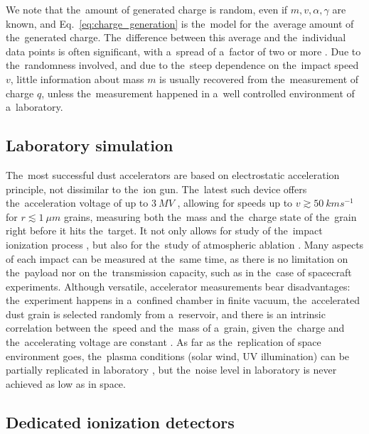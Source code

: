 We note that the~amount of generated charge is random, even if $m,v,\alpha,\gamma$ are known, and Eq.~\ref{eq:charge_generation} is the~model for the~average amount of the~generated charge. The~difference between this average and the~individual data points is often significant, with a~spread of a~factor of two or more \citep{collette2014micrometeoroid,shen2021cosmic}. Due to the~randomness involved, and due to the~steep dependence on the~impact speed $v$, little information about mass $m$ is usually recovered from the~measurement of charge $q$, unless the~measurement happened in a~well controlled environment of a~laboratory.

\subsection{Laboratory simulation}

The~most successful dust accelerators are based on electrostatic acceleration principle, not dissimilar to the~ion gun. The~latest such device offers the~acceleration voltage of up to $\SI{3}{MV}$ \citep{shu20123}, allowing for speeds up to $v\gtrsim \SI{50}{kms^{-1}}$ for $r\lesssim\SI{1}{\mu m}$ grains, measuring both the~mass and the~charge state of the~grain right before it hits the~target. It not only allows for study of the~impact ionization process \citep{collette2014micrometeoroid,nouzak2018laboratory,kovcivsvcak2020effective,nouzak2021detection,shen2021electrostatic,shen2021laboratory,shen2023variability}, but also for the~study of atmospheric ablation \citep{thomas2017experimental,deluca2018ionization,deluca2022differential,tarnecki2023experimentally}. Many aspects of each impact can be measured at the~same time, as there is no limitation on the~payload nor on the~transmission capacity, such as in the~case of spacecraft experiments. Although versatile, accelerator measurements bear disadvantages: the~experiment happens in a~confined chamber in finite vacuum, the~accelerated dust grain is selected randomly from a~reservoir, and there is an intrinsic correlation between the~speed and the~mass of a~grain, given the~charge and the~accelerating voltage are constant \citep{shelton1960electrostatic}. As far as the~replication of space environment goes, the~plasma conditions (solar wind, UV illumination) can be partially replicated in laboratory \citep{shu20123,horanyi2008surface}, but the~noise level in laboratory is never achieved as low as in space. 

\subsection{Dedicated ionization detectors}

